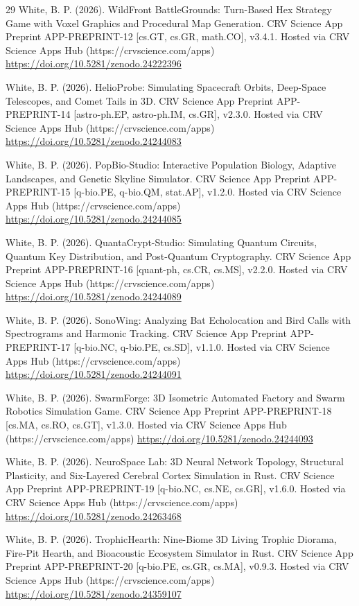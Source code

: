 \documentclass[10pt,letterpaper]{article}
\begin{document}
\begin{thebibliography}{29}
 White, B. P. (2026). WildFront BattleGrounds: Turn-Based Hex Strategy Game with Voxel Graphics and Procedural Map Generation. CRV Science App Preprint APP-PREPRINT-12 [cs.GT, cs.GR, math.CO], v3.4.1. Hosted via CRV Science Apps Hub (https://crvscience.com/apps) \url{https://doi.org/10.5281/zenodo.24222396}

 White, B. P. (2026). HelioProbe: Simulating Spacecraft Orbits, Deep-Space Telescopes, and Comet Tails in 3D. CRV Science App Preprint APP-PREPRINT-14 [astro-ph.EP, astro-ph.IM, cs.GR], v2.3.0. Hosted via CRV Science Apps Hub (https://crvscience.com/apps) \url{https://doi.org/10.5281/zenodo.24244083}

 White, B. P. (2026). PopBio-Studio: Interactive Population Biology, Adaptive Landscapes, and Genetic Skyline Simulator. CRV Science App Preprint APP-PREPRINT-15 [q-bio.PE, q-bio.QM, stat.AP], v1.2.0. Hosted via CRV Science Apps Hub (https://crvscience.com/apps) \url{https://doi.org/10.5281/zenodo.24244085}

 White, B. P. (2026). QuantaCrypt-Studio: Simulating Quantum Circuits, Quantum Key Distribution, and Post-Quantum Cryptography. CRV Science App Preprint APP-PREPRINT-16 [quant-ph, cs.CR, cs.MS], v2.2.0. Hosted via CRV Science Apps Hub (https://crvscience.com/apps) \url{https://doi.org/10.5281/zenodo.24244089}

 White, B. P. (2026). SonoWing: Analyzing Bat Echolocation and Bird Calls with Spectrograms and Harmonic Tracking. CRV Science App Preprint APP-PREPRINT-17 [q-bio.NC, q-bio.PE, cs.SD], v1.1.0. Hosted via CRV Science Apps Hub (https://crvscience.com/apps) \url{https://doi.org/10.5281/zenodo.24244091}

 White, B. P. (2026). SwarmForge: 3D Isometric Automated Factory and Swarm Robotics Simulation Game. CRV Science App Preprint APP-PREPRINT-18 [cs.MA, cs.RO, cs.GT], v1.3.0. Hosted via CRV Science Apps Hub (https://crvscience.com/apps) \url{https://doi.org/10.5281/zenodo.24244093}

 White, B. P. (2026). NeuroSpace Lab: 3D Neural Network Topology, Structural Plasticity, and Six-Layered Cerebral Cortex Simulation in Rust. CRV Science App Preprint APP-PREPRINT-19 [q-bio.NC, cs.NE, cs.GR], v1.6.0. Hosted via CRV Science Apps Hub (https://crvscience.com/apps) \url{https://doi.org/10.5281/zenodo.24263468}

 White, B. P. (2026). TrophicHearth: Nine-Biome 3D Living Trophic Diorama, Fire-Pit Hearth, and Bioacoustic Ecosystem Simulator in Rust. CRV Science App Preprint APP-PREPRINT-20 [q-bio.PE, cs.GR, cs.MA], v0.9.3. Hosted via CRV Science Apps Hub (https://crvscience.com/apps) \url{https://doi.org/10.5281/zenodo.24359107}


\end{thebibliography}
\end{document}
